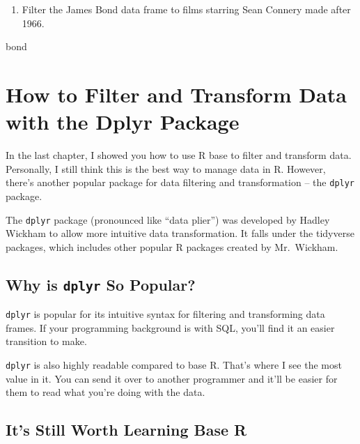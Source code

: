 \documentclass[
]{book}
\newenvironment{Shaded}{\begin{snugshade}}{\end{snugshade}}
\newcommand{\NormalTok}[1]{#1}
\providecommand{\tightlist}{%
  \setlength{\itemsep}{0pt}\setlength{\parskip}{0pt}}
\begin{document}
\begin{center}
\begin{enumerate}
\def\labelenumi{\arabic{enumi}.}
\setcounter{enumi}{6}
\tightlist
\item
  Filter the James Bond data frame to films starring Sean Connery made after 1966.
\end{enumerate}

\begin{Shaded}
\begin{Highlighting}[]
\NormalTok{bond}
\end{Highlighting}
\end{Shaded}

\hypertarget{dplyr}{%
\chapter{How to Filter and Transform Data with the Dplyr Package}\label{dplyr}}

In the last chapter, I showed you how to use R base to filter and transform data. Personally, I still think this is the best way to manage data in R. However, there's another popular package for data filtering and transformation -- the \texttt{dplyr} package.

The \texttt{dplyr} package (pronounced like ``data plier'') was developed by Hadley Wickham to allow more intuitive data transformation. It falls under the tidyverse packages, which includes other popular R packages created by Mr.~Wickham.

\hypertarget{why-is-dplyr-so-popular}{%
\section{\texorpdfstring{Why is \texttt{dplyr} So Popular?}{Why is dplyr So Popular?}}\label{why-is-dplyr-so-popular}}

\texttt{dplyr} is popular for its intuitive syntax for filtering and transforming data frames. If your programming background is with SQL, you'll find it an easier transition to make.

\texttt{dplyr} is also highly readable compared to base R. That's where I see the most value in it. You can send it over to another programmer and it'll be easier for them to read what you're doing with the data.

\hypertarget{its-still-worth-learning-base-r}{%
\section{It's Still Worth Learning Base R}\label{its-still-worth-learning-base-r}}


\end{center}
\end{document}

